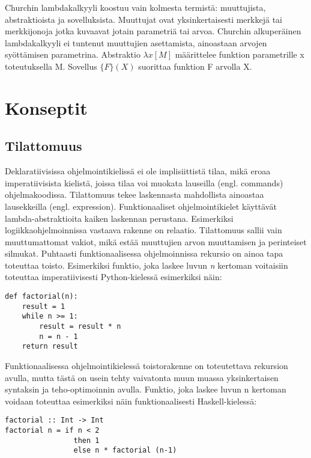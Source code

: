 Churchin lambdakalkyyli koostuu vain kolmesta termistä: muuttujista, abstraktioista ja sovelluksista.
Muuttujat ovat yksinkertaisesti merkkejä tai merkkijonoja jotka kuvaavat jotain parametriä tai arvoa. Churchin
alkuperäinen lambdakalkyyli ei tuntenut muuttujien asettamista, ainoastaan arvojen syöttämisen parametrina. Abstraktio
$ \lambda x [ M ] $ määrittelee funktion parametrille x toteutuksella M. Sovellus $ \{ F \} ( X ) $ suorittaa funktion F
arvolla X. \cite{lambdacalculus}

\section{Konseptit}

\subsection{Tilattomuus}
Deklaratiivisissa ohjelmointikielissä ei ole implisiittistä tilaa, mikä eroaa imperatiivisista kielistä, joissa tilaa
voi muokata lauseilla (engl. commands) ohjelmakoodissa. Tilattomuus tekee laskennasta mahdollista ainoastaa
lausekkeilla (engl. expression). Funktionaaliset ohjelmointikielet käyttävät lambda-abstraktioita kaiken laskennan
perustana. Esimerkiksi logiikkaohjelmoinnissa vastaava rakenne on relaatio. Tilattomuus sallii vain muuttumattomat
vakiot, mikä estää muuttujien arvon muuttamisen ja perinteiset silmukat. Puhtaasti funktionaalisessa ohjelmoinnissa
rekursio on ainoa tapa toteuttaa toisto. Esimerkiksi funktio, joka laskee luvun \textit{n} kertoman voitaisiin toteuttaa
imperatiivisesti Python-kielessä esimerkiksi näin:
\begin{verbatim}
def factorial(n):
    result = 1
    while n >= 1:
        result = result * n
        n = n - 1
    return result
\end{verbatim}
Funktionaalisessa ohjelmointikielessä toistorakenne on toteutettava rekursion avulla, mutta tästä on usein tehty
vaivatonta muun muassa yksinkertaisen syntaksin ja teho-optimoinnin avulla. \cite{hudak} Funktio, joka laskee luvun n
kertoman voidaan toteuttaa esimerkiksi näin funktionaalisesti Haskell-kielessä:
\begin{verbatim}
factorial :: Int -> Int
factorial n = if n < 2
                then 1
                else n * factorial (n-1)
\end{verbatim}

